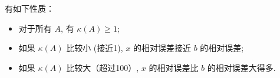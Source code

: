 \begin{corollary}
    有如下性质：

    \begin{itemize}
        \item 对于所有 $ A $, 有 $ \kappa(A) \geq 1 $;
        \item 如果 $ \kappa(A) $ 比较小 (接近1),  $ x $ 的相对误差接近 $ b $ 的相对误差;
        \item 如果 $ \kappa(A) $ 比较大（超过100）,  $ x $ 的相对误差比 $ b $ 的相对误差大得多. 
    \end{itemize}
\end{corollary}


